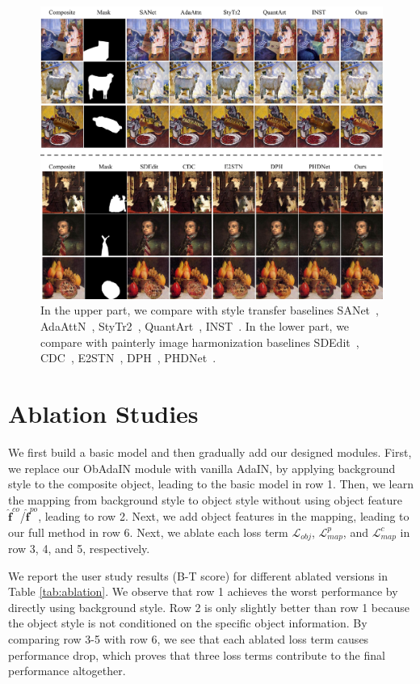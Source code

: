 \documentclass[letterpaper]{article} %
\begin{document}
\begin{figure}[h]
\centering
\includegraphics[width=0.92\linewidth]{figures/baseline_supp2.jpg}
\caption{In the upper part, we compare with style transfer baselines SANet~\cite{park2019arbitrary}, AdaAttN~\cite{liu2021adaattn}, StyTr2~\cite{deng2022stytr2}, QuantArt~\cite{quantart}, INST~\cite{inst}. 
In the lower part, we compare with painterly image harmonization baselines SDEdit~\cite{sdedit}, CDC~\cite{cdc}, E2STN~\cite{peng2019element}, DPH~\cite{luan2018deep}, PHDNet~\cite{cao2022painterly}.
 }
\label{fig:baseline_supp}
\end{figure}




\section{Ablation Studies} \label{sec:ablation}

We first build a basic model and then gradually add our designed modules. First, we replace our ObAdaIN module with vanilla AdaIN, by applying background style to the composite object, leading to the basic model in row 1. 
Then, we learn the mapping from background style to object style without using object feature $\hat{\bm{f}}^{co}$/$\hat{\bm{f}}^{po}$, leading to row 2. Next, we add object features in the mapping, leading to our full method in row 6. 
Next, we ablate each loss term $\mathcal{L}_{obj}$, $\mathcal{L}_{map}^p$, and $\mathcal{L}_{map}^c$ in row 3, 4, and 5, respectively. 

We report the user study results (B-T score) for different ablated versions in Table \ref{tab:ablation}. We observe that row 1 achieves the worst performance by directly using background style. Row 2 is only slightly better than row 1 because the object style is not conditioned on the specific object information.  By comparing row 3-5 with row 6, we see that each ablated loss term causes performance drop, which proves that three loss terms contribute to the final performance altogether. 
\end{document}
